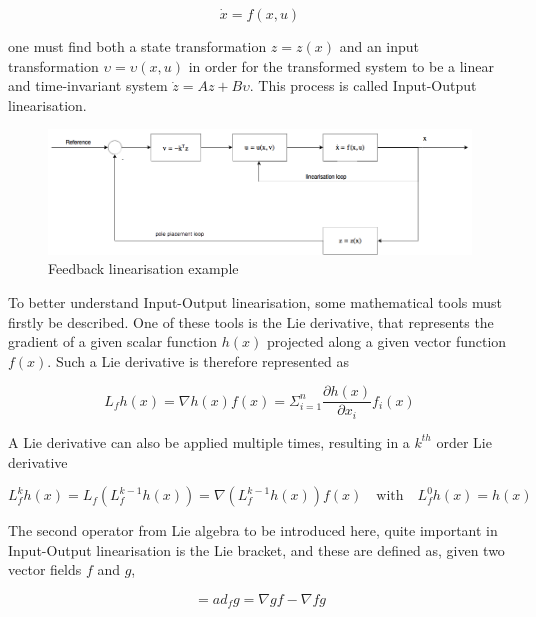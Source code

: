 \begin{equation}
\dot{x} = f(x,u)
\label{eq:nonlinear_system}
\end{equation}

one must find both a state transformation $z=z(x)$ and an input transformation $\upsilon = \upsilon(x,u)$ in order for the transformed system to be a linear and time-invariant system $\dot{z} = Az+B\upsilon$. This process is called Input-Output linearisation. 

\begin{figure}[!htb]
  \centering
  \includegraphics[width=1\textwidth]{Figures/NLI}
  \caption[Feedback linearisation example]{Feedback linearisation example \cite{Slotine+Li}}
  \label{fig:nli}
\end{figure}

To better understand Input-Output linearisation, some mathematical tools must firstly be described. One of these tools is the Lie derivative, that represents the gradient of a given scalar function $h(x)$ projected along a given vector function $f(x)$. Such a Lie derivative is therefore represented as

\begin{equation}
L_fh(x) = \nabla h(x)f(x) = \Sigma^n_{i=1}\dfrac{\partial h(x)}{\partial x_i}f_i(x)
\end{equation}

A Lie derivative can also be applied multiple times, resulting in a $k^{th}$ order Lie derivative

\begin{equation}
L^k_fh(x)=L_f\left(L^{k-1}_fh(x)\right)=\nabla \left(L^{k-1}_fh(x)\right)f(x) \quad \text{with} \quad L^0_fh(x)=h(x)
\end{equation}

The second operator from Lie algebra to be introduced here, quite important in Input-Output linearisation is the Lie bracket, and these are defined as, given two vector fields $f$ and $g$,

\begin{equation}
[f,g] = ad_f g = \nabla g f - \nabla f g
\end{equation}

